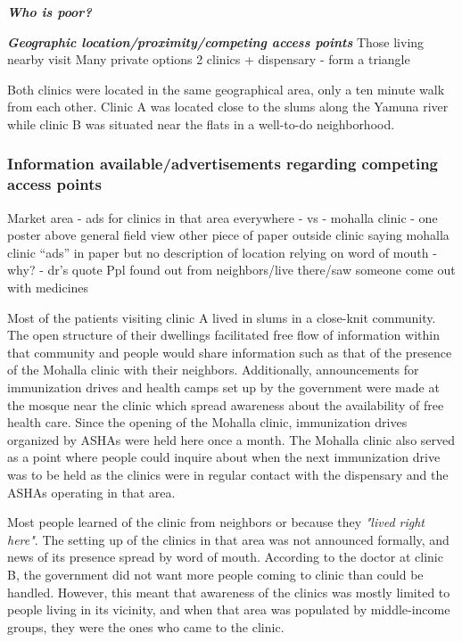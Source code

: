 \textbf{\textit{Who is poor?}}


\textit{\textbf{Geographic location/proximity/competing access points}}
	Those living nearby visit
	Many private options
2 clinics + dispensary - form a triangle

Both clinics were located in the same geographical area, only a ten minute walk from each other. Clinic A was located close to the slums along the Yamuna river while clinic B was situated near the flats in a well-to-do neighborhood. %

\subsubsection{Information available/advertisements regarding competing access points}

Market area - ads for clinics in that area everywhere - vs - mohalla clinic - one poster     above general field view other piece of paper outside clinic saying mohalla clinic 
“ads” in paper but no description of location
relying on word of mouth - why? - dr’s quote
	Ppl found out from neighbors/live there/saw someone come out with medicines

Most of the patients visiting clinic A lived in slums in a close-knit community. The open structure of their dwellings facilitated free flow of information within that community and people would share information such as that of the presence of the Mohalla clinic with their neighbors. Additionally, announcements for immunization drives and health camps set up by the government were made at the mosque near the clinic which spread awareness about the availability of free health care. Since the opening of the Mohalla clinic, immunization drives organized by ASHAs were held here once a month. The Mohalla clinic also served as a point where people could inquire about when the next immunization drive was to be held as the clinics were in regular contact with the dispensary and the ASHAs operating in that area.

Most people learned of the clinic from neighbors or because they  \textit{"lived right here"}. The setting up of the clinics in that area was not announced formally, and news of its presence spread by word of mouth. According to the doctor at clinic B, the government did not want more people coming to clinic than could be handled. However, this meant that awareness of the clinics was mostly limited to people living in its vicinity, and when that area was populated by middle-income groups, they were the ones who came to the clinic.


